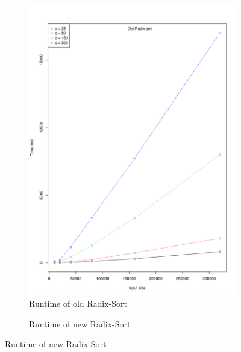 \documentclass[a4paper]{scrartcl}
\begin{document}
\begin{figure}
    \centering
    \begin{subfigure}{.5\textwidth}
      \centering
      \caption{Runtime of old Radix-Sort}
      \includegraphics[width=\linewidth]{resources/runtime_old_sort.png}
    \end{subfigure}%
    \begin{subfigure}{.5\textwidth}
      \centering
      \caption{Runtime of new Radix-Sort}

\end{subfigure}
\end{figure}
\end{document}
